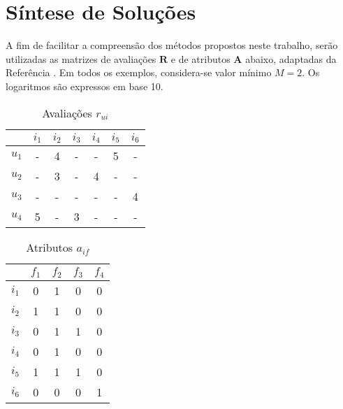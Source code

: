 \chapter[Síntese de Soluções]{Síntese de Soluções}
\label{chap:sintese_de_solucoes}

A fim de facilitar a compreensão dos métodos propostos neste trabalho, serão utilizadas as matrizes de avaliações $\mathbf{R}$ e de atributos $\mathbf{A}$ abaixo, adaptadas da Referência . Em todos os exemplos, considera-se valor mínimo $M=2$. Os logaritmos são expressos em base 10.

\begin{table}[h]
\begin{center}
    \caption{Avaliações $r_{ui}$}
    \label{tab:rui_ref}
    \begin{tabular}{ | c | c | c | c | c | c | c | } 
    \hline
     & $i_1$ & $i_2$ & $i_3$ & $i_4$ & $i_5$ & $i_6$ \\ \hline
     $u_1$ & - & 4 & - & - & 5 & - \\ \hline
     $u_2$ & - & 3 & - & 4 & - & - \\ \hline
     $u_3$ & - & - & - & - & - & 4 \\ \hline
     $u_4$ & 5 & - & 3 & - & - & - \\ \hline
    \end{tabular}
\end{center}
\end{table}

\begin{table}[h]
\begin{center}
    \caption{Atributos $a_{if}$}
    \label{tab:aif_ref}
    \begin{tabular}{ | c | c | c | c | c | } 
    \hline
     & $f_1$ & $f_2$ & $f_3$ & $f_4$  \\ \hline
     $i_1$ & 0 & 1 & 0 & 0  \\ \hline
     $i_2$ & 1 & 1 & 0 & 0  \\ \hline
     $i_3$ & 0 & 1 & 1 & 0  \\ \hline
     $i_4$ & 0 & 1 & 0 & 0  \\ \hline
     $i_5$ & 1 & 1 & 1 & 0  \\ \hline
     $i_6$ & 0 & 0 & 0 & 1  \\ \hline
    \end{tabular}
\end{center}
\end{table}

